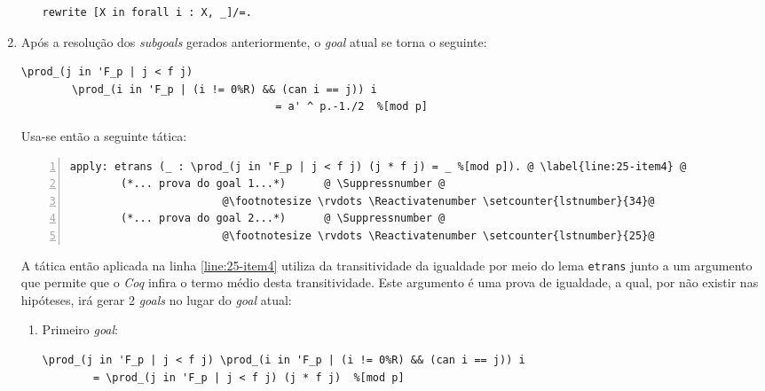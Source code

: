 \begin{enumerate}[label=\textbf{\roman*.}]
\begin{enumerate}[listparindent=\parindent]
                        \begin{lstlisting}[language=coq,frame=single,tabsize=1]
rewrite [X in forall i : X, _]/=.
                        \end{lstlisting}

        \end{enumerate}

        \item Após a resolução dos \textit{subgoals} gerados anteriormente, o \textit{goal} atual se torna o seguinte:
                \begin{lstlisting}[language=coq,frame=single,tabsize=1]
\prod_(j in 'F_p | j < f j) 
        \prod_(i in 'F_p | (i != 0%R) && (can i == j)) i
                                        = a' ^ p.-1./2  %[mod p]
                \end{lstlisting}
        Usa-se então a seguinte tática:

                \begin{lstlisting}[language=coq,frame=single, numbers=left,stepnumber=1,tabsize=1,name=proof, escapechar=\@]
apply: etrans (_ : \prod_(j in 'F_p | j < f j) (j * f j) = _ %[mod p]). @ \label{line:25-item4} @
        (*... prova do goal 1...*)      @ \Suppressnumber @
                        @\footnotesize \rvdots \Reactivatenumber \setcounter{lstnumber}{34}@
        (*... prova do goal 2...*)      @ \Suppressnumber @
                        @\footnotesize \rvdots \Reactivatenumber \setcounter{lstnumber}{25}@
                \end{lstlisting}
        A tática então aplicada na linha \ref{line:25-item4} utiliza da transitividade da igualdade por meio do lema \lstinline[language=coq]|etrans| junto a um argumento que permite que o \textit{Coq} infira o termo médio desta transitividade. Este argumento é uma prova de igualdade, a qual, por não existir nas hipóteses, irá gerar 2 \textit{goals} no lugar do \textit{goal} atual:

        \begin{enumerate}[label=\textbf{\roman{enumi}.(\alph*)}]
                \item Primeiro \textit{goal}:
                
                        \begin{lstlisting}[language=coq,frame=single,tabsize=1]
\prod_(j in 'F_p | j < f j) \prod_(i in 'F_p | (i != 0%R) && (can i == j)) i
        = \prod_(j in 'F_p | j < f j) (j * f j)  %[mod p]
                        \end{lstlisting}
                

\end{enumerate}
\end{enumerate}

